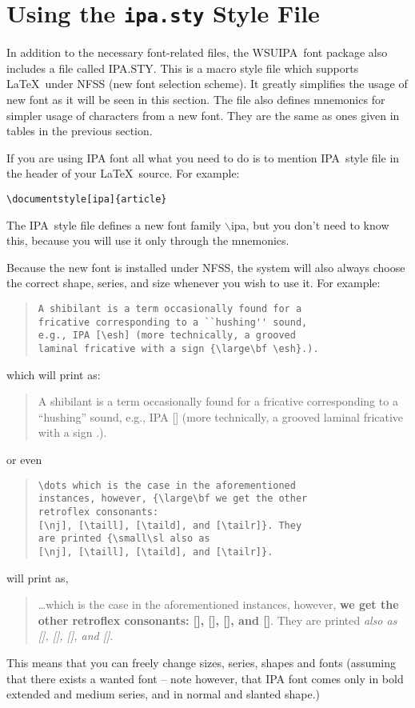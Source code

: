 \documentclass[12pt]{article}
\newcommand{\B}[1]{$\backslash$#1}
\newcommand{\wsu}{{\small\rm WSUIPA}}
\newcommand{\ipas}{{\small\rm IPA}}
\begin{document}
\section{Using the {\tt{}ipa.sty} Style File}

In addition to the necessary font-related files, the \wsu\ font
package also includes a file called {\ipas.STY}. This is a macro style
file which supports \LaTeX\ under NFSS (new font selection scheme). It
greatly simplifies the usage of new font as it will be seen in this
section. The file also defines mnemonics for simpler usage of
characters from a new font. They are the same as ones given in tables
in the previous section.

If you are using IPA font all what you need to do is to mention \ipas\
style file in the header of your \LaTeX\ source. For example:
%
\begin{verbatim}
\documentstyle[ipa]{article}
\end{verbatim}

The \ipas\ style file defines a new font family \B{ipa}, but you
don't need to know this, because you will use it only through the
mnemonics.

Because the new font is installed under NFSS, the system will also
always choose the correct shape, series, and size whenever you wish to
use it. For example:
%
\begin{quote}\begin{verbatim}
A shibilant is a term occasionally found for a
fricative corresponding to a ``hushing'' sound,
e.g., IPA [\esh] (more technically, a grooved
laminal fricative with a sign {\large\bf \esh}.).
\end{verbatim}\end{quote}
%
which will print as:
%
\begin{quote}
A shibilant is a term occasionally found for a
fricative corresponding to a ``hushing'' sound,
e.g., IPA [\esh] (more technically, a grooved
laminal fricative with a sign {\large\bf \esh}.).
\end{quote}
%
or even
%
\begin{quote}\begin{verbatim}
\dots which is the case in the aforementioned
instances, however, {\large\bf we get the other
retroflex consonants:
[\nj], [\taill], [\taild], and [\tailr]}. They
are printed {\small\sl also as
[\nj], [\taill], [\taild], and [\tailr]}.
\end{verbatim}\end{quote}
%
will print as,
%
\begin{quote}
\dots which is the case in the aforementioned
instances, however, {\bf\large we get the
other retroflex consonants:
[\nj], [\taill], [\taild], and [\tailr]}. They
are printed {\sl\small also as
[\nj], [\taill], [\taild], and [\tailr]}.
\end{quote}
%
%
This means that you can freely change sizes, series, shapes and fonts
(assuming that there exists a wanted font -- note however, that IPA
font comes only in bold extended and medium series, and in normal and
slanted shape.)
\end{document}
